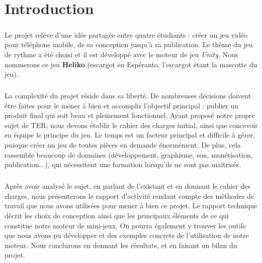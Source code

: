 \chapter{Introduction}

\paragraph{}
Le projet relève d'une idée partagée entre quatre étudiants : créer un jeu vidéo pour téléphone mobile, de sa conception jusqu'à sa publication. Le thème du jeu de rythme a été choisi et il est développé avec le moteur de jeu \textit{Unity}. Nous nommerons ce jeu \textbf{Heliko} (escargot en Espéranto, l'escargot étant la mascotte du jeu).

\paragraph{}
La complexité du projet réside dans sa liberté. De nombreuses décisions doivent être faites pour le mener à bien et accomplir l'objectif principal : publier un produit final qui soit beau et pleinement fonctionnel. Ayant proposé notre propre sujet de TER, nous devons établir le cahier des charges initial, ainsi que concevoir en équipe le principe du jeu. Le temps est un facteur principal et difficile à gérer, puisque créer un jeu de toutes pièces en demande énormément. De plus, cela rassemble beaucoup de domaines (développement, graphisme, son, monétisation, publication...), qui nécessitent une formation lorsqu'ils ne sont pas maîtrisés.

\paragraph{}
Après avoir analysé le sujet, en parlant de l'existant et en donnant le cahier des charges, nous présenterons le rapport d'activité rendant compte des méthodes de travail que nous avons utilisées pour mener à bien ce projet. Le rapport technique décrit les choix de conception ainsi que les principaux éléments de ce qui constitue notre moteur de mini-jeux. On pourra également y trouver les outils que nous avons pu développer et des exemples concrets de l'utilisation de notre moteur. Nous conclurons en donnant les résultats, et en faisant un bilan du projet.
